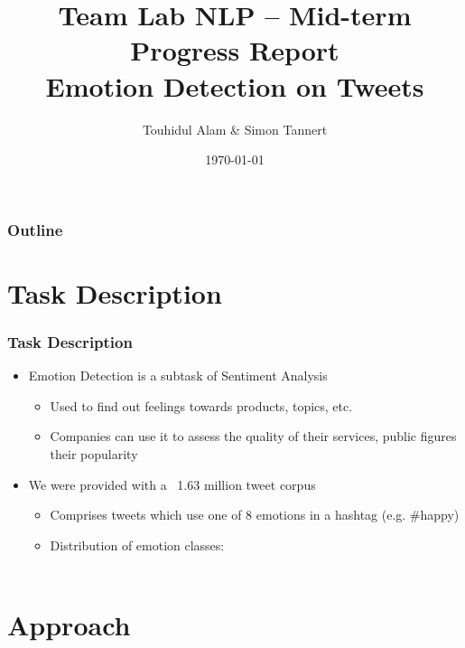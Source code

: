 \documentclass[10pt,aspectratio=169]{beamer}
\date[{\tt \jobname}]{\today}
\title[TSTU]{Team Lab NLP -- Mid-term Progress Report\\Emotion Detection on Tweets}
\author[Tannert]{Touhidul Alam \& Simon Tannert}
\institute[IMS]{IMS, Universit\"at Stuttgart}
\begin{document}
\begin{frame}
  \titlepage
\end{frame}

\begin{frame}
  \frametitle{Outline}
  \tableofcontents
\end{frame}

\section{Task Description}

\begin{frame}
  \frametitle{Task Description}
  \begin{itemize}
    \item Emotion Detection is a subtask of Sentiment Analysis
    \begin{itemize}
      \item Used to find out feelings towards products, topics, etc.
      \item Companies can use it to assess the quality of their services, public figures their popularity
    \end{itemize}
    \item We were provided with a ~1.63 million tweet corpus
    \begin{itemize}
      \item Comprises tweets which use one of 8 emotions in a hashtag (e.g. \#happy)
      \item Distribution of emotion classes:\\~\\
    \end{itemize}
  \end{itemize}
\end{frame}

\section{Approach}
\end{document}
